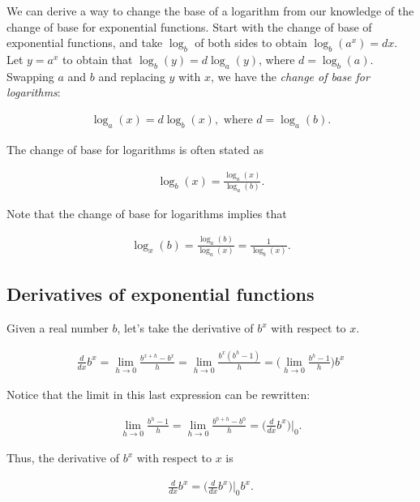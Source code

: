 We can derive a way to change the base of a logarithm from our knowledge of the change of base for exponential functions. Start with the change of base of exponential functions, and take $\log_b$ of both sides to obtain $\log_b(a^x) = dx$. Let $y = a^x$ to obtain that ${\log_b(y) = d\log_a(y)}$, where $d = \log_b(a)$. Swapping $a$ and $b$ and replacing $y$ with $x$, we have the \textit{change of base for logarithms}:

\begin{align*}
    \log_a(x) = d\log_b(x), \text{ where $d = \log_a(b)$}.
\end{align*}

The change of base for logarithms is often stated as

\begin{align*}
    \log_b(x) = \frac{\log_a(x)}{\log_a(b)}.
\end{align*}

Note that the change of base for logarithms implies that

\begin{align*}
    \log_x(b) = \frac{\log_a(b)}{\log_a(x)} = \frac{1}{\log_b(x)}.
\end{align*}

\subsection*{Derivatives of exponential functions}

Given a real number $b$, let's take the derivative of $b^x$ with respect to $x$.

\begin{align*}
    \frac{d}{dx} b^x = \lim_{h \rightarrow 0} \frac{b^{x + h} - b^x}{h}
    = \lim_{h \rightarrow 0} \frac{b^x (b^h - 1)}{h}
    = \Big( \lim_{h \rightarrow 0} \frac{b^h - 1}{h} \Big) b^x
\end{align*}

Notice that the limit in this last expression can be rewritten:

\begin{align*}
    \lim_{h \rightarrow 0} \frac{b^h - 1}{h} = \lim_{h \rightarrow 0} \frac{b^{0 + h} - b^0}{h} = \Big( \frac{d}{dx} b^x \Big)\Big|_0.
\end{align*}

Thus, the derivative of $b^x$ with respect to $x$ is

\begin{align*}
   \frac{d}{dx} b^x = \Big( \frac{d}{dx} b^x \Big)\Big|_0 b^x.
\end{align*}

